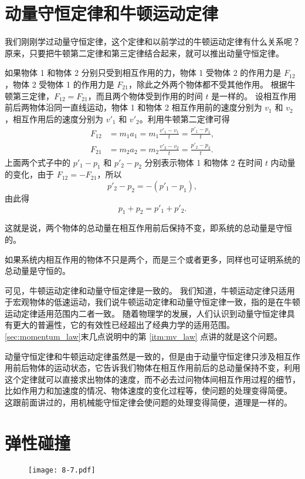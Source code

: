 \section{动量守恒定律和牛顿运动定律}
我们刚刚学过动量守恒定律，这个定律和以前学过的牛顿运动定律有什么关系呢？
原来，只要把牛顿第二定律和第三定律结合起来，就可以推出动量守恒定律。

如果物体 1 和物体 2 分别只受到相互作用的力，物体 1 受物体 2 的作用力是 $F_{12}$，物体 2 受物体 1 的作用力是 $F_{21}$，除此之外两个物体都不受其他作用。
根据牛顿第三定律，$F_{12}=F_{21}$，而且两个物体受到作用的时间 $t$ 是一样的。
设相互作用前后两物体沿同一直线运动，物体 1 和物体 2 相互作用前的速度分别为 $v_1$ 和 $v_2$，相互作用后的速度分别为 $v'_1$ 和 $v'_2$。利用牛顿第二定律可得
\[\begin{split}
  F_{12}&=m_1a_1=m_1\frac{v'_1-v_1}{t}=\frac{p'_1-p_1}{t},\\
  F_{21}&=m_2a_2=m_2\frac{v'_2-v_2}{t}=\frac{p'_2-p_2}{t}.
\end{split}\]
上面两个式子中的 $p'_1-p_1$ 和 $p'_2-p_2$ 分别表示物体 1 和物体 2 在时间 $t$ 内动量的变化，由于 $F_{12}=-F_{21}$，所以
\[p'_2-p_2=- (p'_1-p_1),\]
由此得
\[p_1+p_2=p'_1+p'_2.\]

这就是说，两个物体的总动量在相互作用前后保持不变，即系统的总动量是守恒的。

如果系统内相互作用的物体不只是两个，而是三个或者更多，同样也可证明系统的总动量是守恒的。

可见，牛顿运动定律和动量守恒定律是一致的。
我们知道，牛顿运动定律只适用于宏观物体的低速运动，我们说牛顿运动定律和动量守恒定律一致，指的是在牛顿运动定律适用范围内二者一致。
随着物理学的发展，人们认识到动量守恒定律具有更大的普遍性，它的有效性已经超出了经典力学的适用范围。
\cref{sec:momentum_law}末几点说明中的第 \ref{itm:mv_law} 点讲的就是这个问题。

动量守恒定律和牛顿运动定律虽然是一致的，但是由于动量守恒定律只涉及相互作用前后物体的运动状态，它告诉我们物体在相互作用前后的总动量保持不变，利用这个定律就可以直接求出物体的速度，而不必去过问物体间相互作用过程的细节，比如作用力和加速度的情况、物体速度的变化过程等，使问题的处理变得简便。
这跟前面讲过的，用机械能守恒定律会使问题的处理变得简便，道理是一样的。

\section{弹性碰撞}
\setcounter{figure}{6}
\begin{figure}
  \texttt{[image: 8-7.pdf]}
  \caption{}\label{fig:8-7}
\end{figure}

